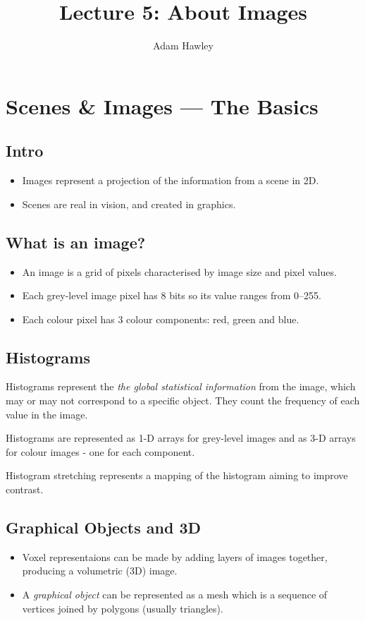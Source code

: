 \documentclass{article}
\begin{document}
\title{Lecture 5: About Images}
\author{Adam Hawley}

\maketitle
\tableofcontents
\newpage

\section{Scenes \& Images --- The Basics}
\subsection{Intro}
\begin{itemize}
	\item Images represent a projection of the information from a scene in 2D.
	\item Scenes are real in vision, and created in graphics.
\end{itemize}
\subsection{What is an image?}
\begin{itemize}
	\item An image is a grid of pixels characterised by image size and pixel values.
	\item Each grey-level image pixel has 8 bits so its value ranges from 0--255. 
	\item Each colour pixel has 3 colour components: red, green and blue.
\end{itemize}

\subsection{Histograms}
Histograms represent the {\it the global statistical information} from the image, which may or may not correspond to a specific object. 
They count the frequency of each value in the image.

Histograms are represented as 1-D arrays for grey-level images and as 3-D arrays for colour images - one for each component.

Histogram stretching represents a mapping of the histogram aiming to improve contrast.

\subsection{Graphical Objects and 3D}
\begin{itemize}
	\item Voxel representaions can be made by adding layers of images together, producing a volumetric (3D) image.
	\item A {\it graphical object} can be represented as a mesh which is a sequence of vertices joined by polygons (usually triangles).
\end{itemize}
\end{document}

